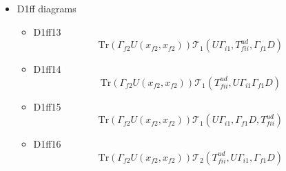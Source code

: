 \documentclass{article}[12pt]
\begin{document}
\begin{itemize}
\begin{itemize}
$$$$
\item W19 diagram
$$
\Gamma_{i1}\left(\gamma,\delta\right){\mathcal V}_3\left(\xi,\Gamma_{f2}U\right)_\gamma{\mathcal V}_4\left(\phi,\Gamma_{f1}D,T^{ud}_{fii}\right)_{\alpha\delta\beta}
$$
\item W19 oet
$$
\phi_U^{f2}(x_{f1})(\gamma_5\phi_D^{f2}\gamma_5\Gamma_{f2})^{\dagger}(x_{i1})
\Gamma_{i1}(\Gamma_{f1}D(x_{f1},x_{i1}))^t\phi_U^{i2}(x_{f1})(\gamma_5\phi_U^{i2}\gamma_5\Gamma_{i2})^{\dagger}(x_{i1})
$$
$$
{\mathcal V}_5(i2,f2)_{\beta\gamma}{\mathcal V}_6(i2,f2)_{\alpha\delta}(phiuf2,phiui2D)
$$
\item W20 diagram
$$
\Gamma_{i1}\left(\gamma,\delta\right){\mathcal V}_3\left(\xi,\Gamma_{f2}U\right)_\gamma{\mathcal V}_2\left(\phi,\Gamma_{f1}D,T^{ud}_{fii}\right)_{\delta\alpha\beta}
$$
\item W20 oet
$$
\phi_U^{i2}(x_{f1})(\gamma_5\phi_U^{i2}\gamma_5\Gamma_{i2})^{\dagger}(x_{i1})\mathrm{Tr}
\phi_U^{f2}(x_{f1})(\gamma_5\phi_D^{f2}\gamma_5\Gamma_{f2})^{\dagger}(x_{i1})\Gamma_{i1}(\Gamma_{f1}D(x_{f1},x_{i1}))^t
$$
\end{itemize}
\item D1ff diagrams
\begin{itemize}
\item D1ff13
$$
\mathrm{Tr}\left(\Gamma_{f2}U\left(x_{f2},x_{f2}\right)\right){\mathcal T}_1\left(U\Gamma_{i1},T^{ud}_{fii},\Gamma_{f1}D\right)
$$
\item D1ff14
$$
\mathrm{Tr}\left(\Gamma_{f2}U\left(x_{f2},x_{f2}\right)\right){\mathcal T}_1\left(T^{ud}_{fii},U\Gamma_{i1}\Gamma_{f1}D\right)
$$
\item D1ff15
$$
\mathrm{Tr}\left(\Gamma_{f2}U\left(x_{f2},x_{f2}\right)\right){\mathcal T}_1\left(U\Gamma_{i1},\Gamma_{f1}D,T^{ud}_{fii}\right)
$$
\item D1ff16
$$
\mathrm{Tr}\left(\Gamma_{f2}U\left(x_{f2},x_{f2}\right)\right){\mathcal T}_2\left(T^{ud}_{fii},U\Gamma_{i1},\Gamma_{f1}D\right)
$$
\end{itemize}
\end{itemize}
\end{document}
